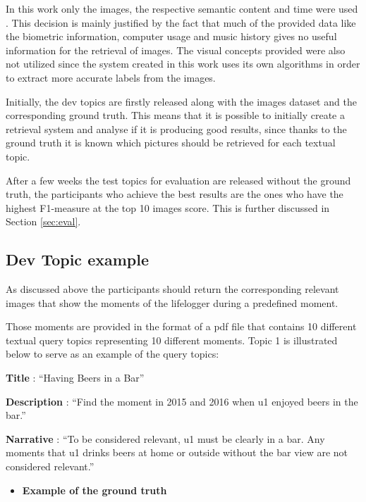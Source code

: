     
    In this work only the images, the respective semantic content and time were used \cite{Ribeiro2020}. This decision is mainly justified by the fact that much of the provided data like the biometric information, computer usage and music history gives no useful information for the retrieval of images. The visual concepts provided were also not utilized since the system created in this work uses its own algorithms in order to extract more accurate labels from the images. 
    

    Initially, the dev topics are firstly released along with the images dataset and the corresponding ground truth. This means that it is possible to initially create a retrieval system and analyse if it is producing good results, since thanks to the ground truth it is known which pictures should be retrieved for each textual topic. 

    After a few weeks the test topics for evaluation are released without the ground truth, the participants who achieve the best results are the ones who have the highest F1-measure at the top 10 images score. This is further discussed in Section \ref{sec:eval}.
    \newpage
    \subsection{Dev Topic example}
    \label{sec:devtopic1}
    As discussed above the participants should return the corresponding relevant images that show the moments of the lifelogger during a predefined moment. 
    
    Those moments are provided in the format of a pdf file that contains 10 different textual query topics representing 10 different moments. Topic 1 is illustrated below to serve as an example of the query topics:
    


   \hfill

        \textbf{Title} : ``Having Beers in a Bar”

        \textbf{Description} : ``Find the moment in 2015 and 2016 when u1 enjoyed beers in the bar.”

        \textbf{Narrative} : ``To be considered relevant, u1 must be clearly in a bar. Any moments that u1 drinks beers at home or outside without the bar view are not considered relevant.”
        


    
    \begin{itemize}
        \item    \textbf{Example of the ground truth}
    \end{itemize}
 


